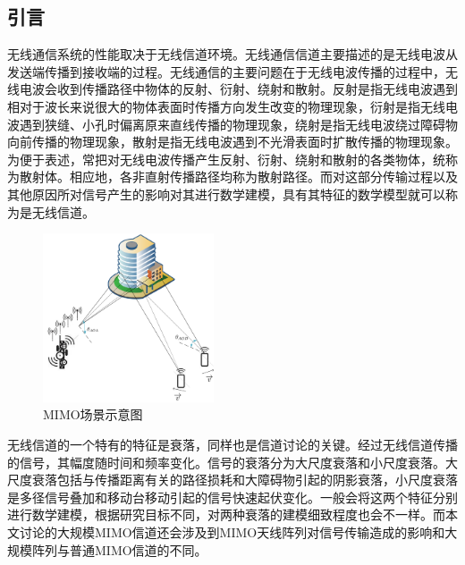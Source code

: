 \documentclass[bachelor,nocolorlinks, printoneside]{seuthesis} %
\begin{document}
\begin{Main}
\section{引言}
无线通信系统的性能取决于无线信道环境。无线通信信道主要描述的是无线电波从发送端传播到接收端的过程。无线通信的主要问题在于无线电波传播的过程中，无线电波会收到传播路径中物体的反射、衍射、绕射和散射。反射是指无线电波遇到相对于波长来说很大的物体表面时传播方向发生改变的物理现象，衍射是指无线电波遇到狭缝、小孔时偏离原来直线传播的物理现象，绕射是指无线电波绕过障碍物向前传播的物理现象，散射是指无线电波遇到不光滑表面时扩散传播的物理现象。为便于表述，常把对无线电波传播产生反射、衍射、绕射和散射的各类物体，统称为散射体。相应地，各非直射传播路径均称为散射路径。而对这部分传输过程以及其他原因所对信号产生的影响对其进行数学建模，具有其特征的数学模型就可以称为是无线信道。

\begin{figure}[htbp!]
	\centering \includegraphics[width=0.45\textwidth]{img/2_1.jpg} \caption{MIMO场景示意图}
\end{figure}

无线信道的一个特有的特征是衰落，同样也是信道讨论的关键。经过无线信道传播的信号，其幅度随时间和频率变化。信号的衰落分为大尺度衰落和小尺度衰落。大尺度衰落包括与传播距离有关的路径损耗和大障碍物引起的阴影衰落，小尺度衰落是多径信号叠加和移动台移动引起的信号快速起伏变化。一般会将这两个特征分别进行数学建模，根据研究目标不同，对两种衰落的建模细致程度也会不一样。而本文讨论的大规模MIMO信道还会涉及到MIMO天线阵列对信号传输造成的影响和大规模阵列与普通MIMO信道的不同。




\end{Main}
\end{document}
